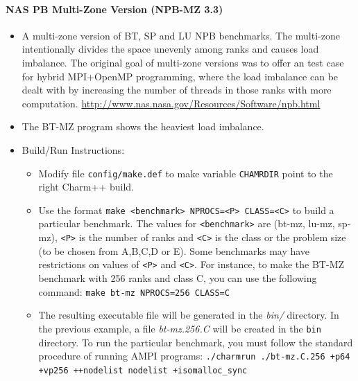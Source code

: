 \documentclass[10pt]{article}
\begin{document}
\paragraph{NAS PB Multi-Zone Version (NPB-MZ 3.3)}
    \begin{itemize}
    \item
      A multi-zone version of BT, SP and LU NPB benchmarks. The
      multi-zone intentionally divides the space unevenly among ranks
      and causes load imbalance. The original goal of multi-zone
      versions was to offer an test case for hybrid MPI+OpenMP
      programming, where the load imbalance can be dealt with by
      increasing the number of threads in those ranks with more
      computation. \url{http://www.nas.nasa.gov/Resources/Software/npb.html}
    \item
      The BT-MZ program shows the heaviest load imbalance.
    \item
      Build/Run Instructions:
      \begin{itemize}
      \item
        Modify file \texttt{config/make.def} to make
        variable \texttt{CHAMRDIR} point to the right Charm++ build.
      \item
        Use the format \texttt{make \textless{}benchmark\textgreater{}
        NPROCS=\textless{}P\textgreater{}
        CLASS=\textless{}C\textgreater{}} to build a particular
        benchmark. The values
        for \texttt{\textless{}benchmark\textgreater{}} are (bt-mz, lu-mz,
        sp-mz), \texttt{\textless{}P\textgreater{}} is the number of ranks
        and \texttt{\textless{}C\textgreater{}} is the class or the
        problem size (to be chosen from A,B,C,D or E). Some benchmarks
        may have restrictions on values
        of \texttt{\textless{}P\textgreater{}} and \texttt{\textless{}C\textgreater{}}.
        For instance, to make the BT-MZ benchmark with 256 ranks and class
        C, you can use the following command: \texttt{make bt-mz NPROCS=256
        CLASS=C}
      \item
        The resulting executable file will be generated in
        the \emph{bin/} directory. In the previous example, a
        file \emph{bt-mz.256.C} will be created in the \texttt{bin} directory.
        To run the particular benchmark, you must follow the standard
        procedure of running AMPI programs: \texttt{./charmrun ./bt-mz.C.256
        +p64 +vp256 ++nodelist nodelist +isomalloc\_sync}
      \end{itemize}
    \end{itemize}
\end{document}
